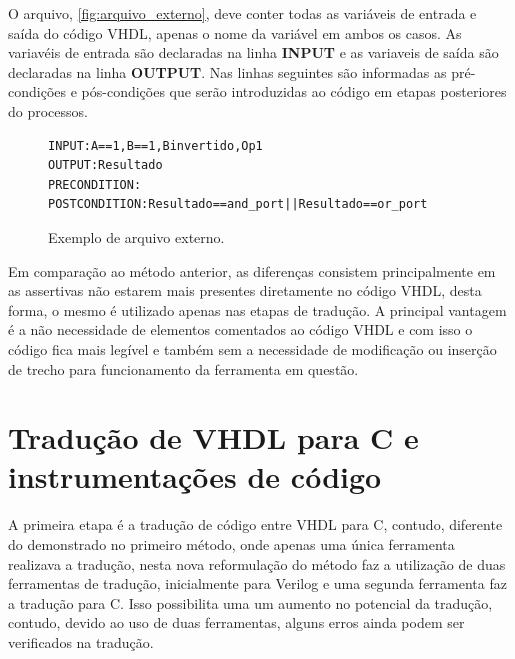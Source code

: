 \par
O arquivo, \autoref{fig:arquivo_externo}, deve conter todas as variáveis de entrada e saída do código VHDL, apenas o nome da variável em ambos os casos. As variavéis de entrada são declaradas na linha \textbf{INPUT} e as variaveis de saída são declaradas na linha \textbf{OUTPUT}. Nas linhas seguintes são informadas as pré-condições e pós-condições que serão introduzidas ao código em etapas posteriores do processos.

\begin{figure}[H]
\caption{\label{fig:arquivo_externo} Exemplo de arquivo externo.}
	\begin{center}
    \begin{minipage}{0.8\textwidth}
    \begin{lstlisting}       
INPUT:A==1,B==1,Binvertido,Op1
OUTPUT:Resultado
PRECONDITION:
POSTCONDITION:Resultado==and_port||Resultado==or_port
    \end{lstlisting}
    \end{minipage}
	\end{center}
\end{figure}

\par
Em comparação ao método anterior, as diferenças consistem principalmente em as assertivas não estarem mais presentes diretamente no código VHDL, desta forma, o mesmo é utilizado apenas nas etapas de tradução. A principal vantagem é a não necessidade de elementos comentados ao código VHDL e com isso o código fica mais legível e também sem a necessidade de modificação ou inserção de trecho para funcionamento da ferramenta em questão.

\section{\label{cap:traducao}Tradução de VHDL para C e instrumentações de código}

\par

A primeira etapa é a tradução de código entre VHDL para C, contudo, diferente do demonstrado no primeiro método, onde apenas uma única ferramenta realizava a tradução, nesta nova reformulação do método faz a utilização de duas ferramentas de tradução, inicialmente para Verilog e uma segunda ferramenta faz a tradução para C. Isso possibilita uma um aumento no potencial da tradução, contudo, devido ao uso de duas ferramentas, alguns erros ainda podem ser verificados na tradução.

